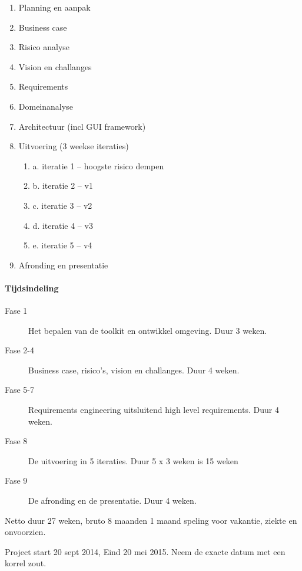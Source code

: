 


\begin{enumerate}
 \item Planning en aanpak
 \item Business case
 \item Risico analyse
 \item Vision en challanges
 \item Requirements
 \item Domeinanalyse
 \item Architectuur (incl GUI framework)
 \item Uitvoering (3 weekse iteraties)
 \begin{enumerate}
  \item a. iteratie 1 -- hoogste risico dempen
  \item b. iteratie 2 -- v1
  \item c. iteratie 3 -- v2
  \item d. iteratie 4 -- v3
  \item e. iteratie 5 -- v4
 \end{enumerate}
\item Afronding en presentatie
\end{enumerate}

\paragraph{Tijdsindeling}

\begin{description}
 \item[Fase 1] Het bepalen van de toolkit en ontwikkel omgeving. Duur 3 weken.
 \item[Fase 2-4] Business case, risico's, vision en challanges. Duur 4 weken.
 \item[Fase 5-7] Requirements engineering uitsluitend high level requirements. Duur 4 weken.
 \item[Fase 8] De uitvoering in 5 iteraties. Duur 5 x 3 weken is 15 weken
 \item[Fase 9] De afronding en de presentatie. Duur 4 weken.
\end{description}

Netto duur 27 weken, bruto 8 maanden 1 maand speling voor vakantie, ziekte en onvoorzien.

Project start 20 sept 2014, Eind 20 mei 2015. Neem de exacte datum met een korrel zout.